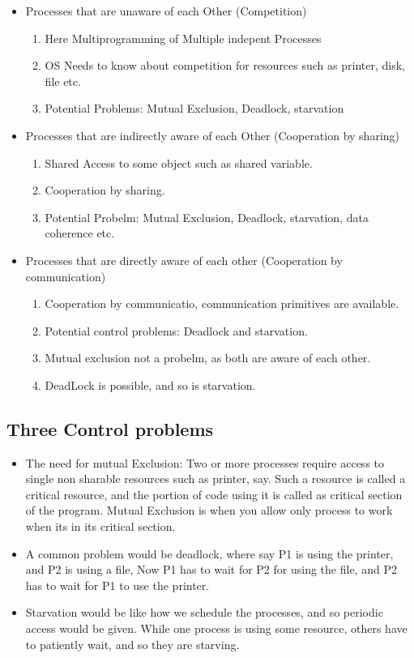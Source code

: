 \documentclass[11pt]{article}
\begin{document}
\begin{itemize}
	\item Processes that are unaware of each Other (Competition)
	      \begin{enumerate}
		      \item Here Multiprogramming of Multiple indepent Processes
		      \item OS Needs to know about competition for resources such as printer, disk, file etc.
		      \item Potential Problems: Mutual Exclusion, Deadlock, starvation
	      \end{enumerate}
	\item Processes that are indirectly aware of each Other (Cooperation by sharing)
	      \begin{enumerate}
		      \item Shared Access to some object such as shared variable.
		      \item Cooperation by sharing.
		      \item Potential Probelm: Mutual Exclusion, Deadlock, starvation, data coherence etc.
	      \end{enumerate}
	\item Processes that are directly aware of each other (Cooperation by communication)
	      \begin{enumerate}
		      \item Cooperation by communicatio, communication primitives are available.
		      \item Potential control problems: Deadlock and starvation.
		      \item Mutual exclusion not a probelm, as both are aware of each other.
		      \item DeadLock is possible, and so is starvation.
	      \end{enumerate}
\end{itemize}


\subsection{Three Control problems}
\begin{itemize}
	\item The need for mutual Exclusion: Two or more processes require access to single non sharable resources such as printer, say. Such a resource is called a critical resource, and the portion of code using it is called as critical section of the program. Mutual Exclusion is when you allow only process to work when its in its critical section.
	\item A common problem would be deadlock, where say P1 is using the printer, and P2 is using a file, Now P1 has to wait for P2 for using the file, and P2 has to wait for P1 to use the printer.
	\item Starvation would be like how we schedule the processes, and so periodic access would be given. While one process is using some resource, others have to patiently wait, and so they are starving.
\end{itemize}
\end{document}
